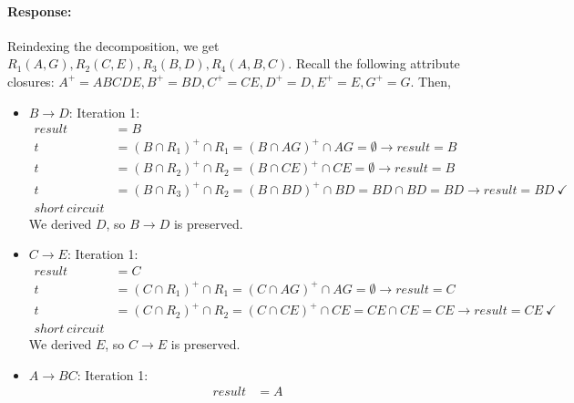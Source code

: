 \documentclass{report}
\newenvironment{response}{\begin{responseframe}\vspace{-10pt}\paragraph{Response:}}{\end{responseframe}}
\begin{document}
\begin{response}
    \noindent Reindexing the decomposition, we get
    $R_1(A, G), R_2(C, E), R_3(B, D), R_4(A, B, C)$. Recall the following attribute closures:
    $A^+ = ABCDE, B^+ = BD, C^+ = CE, D^+ = D, E^+ = E, G^+ = G$. Then,
    \vspace{-0.5em}
    \begin{itemize}[itemsep=0em]
        \item $B \to D$: 
            \newline
            \noindent Iteration 1:
            \vspace{-1em}
            \begin{align*}
                result &= B \\
                t &= (B \cap R_1)^+ \cap R_1
                = (B \cap AG)^+ \cap AG
                = \emptyset \to result = B \\
                t &= (B \cap R_2)^+ \cap R_2
                = (B \cap CE)^+ \cap CE
                = \emptyset \to result = B \\
                t &= (B \cap R_3)^+ \cap R_2
                = (B \cap BD)^+ \cap BD
                = BD \cap BD
                = BD \to result = BD \ \checkmark \\
                short \ circuit
            \end{align*}
            We derived $D$, so $B \to D$ is preserved.
        \item $C \to E$: 
            \newline
            \noindent Iteration 1:
            \vspace{-1em}
            \begin{align*}
                result &= C \\
                t &= (C \cap R_1)^+ \cap R_1
                = (C \cap AG)^+ \cap AG
                = \emptyset \to result = C \\
                t &= (C \cap R_2)^+ \cap R_2
                = (C \cap CE)^+ \cap CE
                = CE \cap CE = CE \to result = CE \ \checkmark \\
                short \ circuit
            \end{align*}
            We derived $E$, so $C \to E$ is preserved.
        \item $A \to BC$: 
            \newline
            \noindent Iteration 1:
            \vspace{-1em}
            \begin{align*}
                result &= A \\

\end{align*}
\end{itemize}
\end{response}
\end{document}
